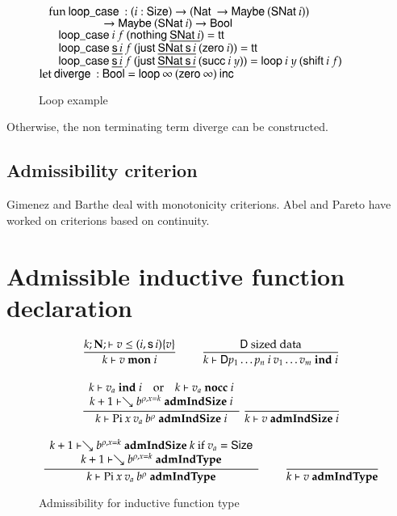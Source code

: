 \begin{figure}[p]
$\hspace*{3mm} \mathrm{fun}\: \mathsf{loop\_case}\: : (i : \mathsf{Size} ) \rightarrow (\mathsf{Nat}\: \rightarrow \mathsf{Maybe}\: (\mathsf{SNat}\: i)) $\\
$\spcx \spcx \ra \Maybe (\SNat i) \ra\Bool$\\
$\spc \spc \lopcase i \: f \: (\nothing \inacc{\SNat i}) = \ttt $\\
$\spc \spc \lopcase \inacc{\s i} \: f \: (\just \inacc{\SNat \s i} \: (\zero i)) = \ttt $\\
$\spc \spc \lopcase \inacc{\s i} \: f \: (\just \inacc{\SNat \s i} \: (\suc i \: y)) = \lop i \: y \: (\shift i \:f) $\\

$\mathrm{let}\: \mathsf{diverge}\: : \mathsf{Bool} = \mathsf{loop}\: \infty\: (\mathsf{zero}\: \infty) \: \mathsf{inc}\:$\\
\caption{Loop example}
\label{loop}
\end{figure}

Otherwise, the non terminating term diverge can be constructed.

\subsection{Admissibility criterion}
Gimenez and Barthe deal with monotonicity criterions.
Abel and Pareto have worked on criterions based on continuity.

\newcommand{\mon}[3]{#1\vdash#2\mbox{ \textbf{mon} }#3}
\newcommand{\indu}[3]{#1\vdash#2\mbox{ \textbf{ind} }#3}
\newcommand{\coind}[3]{#1\vdash#2\mbox{ \textbf{coind} }#3}
\newcommand{\admIndSize}[3]{#1\vdash#2\mbox{ \textbf{admIndSize} }#3}
\newcommand{\admCoSize}[3]{#1\vdash#2\mbox{ \textbf{admCoSize} }#3}
\newcommand{\admIndType}[2]{#1\vdash#2\mbox{ \textbf{admIndType}}}
\newcommand{\admCoType}[2]{#1\vdash#2\mbox{ \textbf{admCoType}}}

\section{Admissible inductive function declaration}

\begin{figure}[p]
\begin{gather*}
\nru{}
{\LeqVal{k}{\nF}{v}{\subst{(i,\s i)}{v}}}
{\mon{k}{v}{i}}
\qquad
\nru{}
{\DD \mbox{ sized data}}
{\indu{k}{\DD p_1 \ldots p_n \: i \: v_1 \ldots v_m}{i}}
\\[2ex]
\ndru{}
{\indu{k}{v_a}{i} \quad \mbox{or} \quad \nocc{k}{v_a}{i}}
{\admIndSize{k+1}{\wh \cl{b}{\ins{\rho}{x}{k}}}{i}}
{\admIndSize{k}{\vpi \: x \: v_a \: \cl{b}{\rho}}{i}}
\nru{}
{}
{\admIndSize{k}{v}{i}}
\\[2ex]
\ndru{}
{\admIndSize{k+1}{\wh \cl{b}{\ins{\rho}{x}{k}}}{k} \mbox{ if } v_a = \Size}
{\admIndType{k+1}{\wh \cl{b}{\ins{\rho}{x}{k}}}}
{\admIndType{k}{\vpi \: x \: v_a \: \cl{b}{\rho}}}
\qquad
\nru{}
{}
{\admIndType{k}{v}}
\end{gather*}
\caption{Admissibility for inductive function type}
\end{figure}

